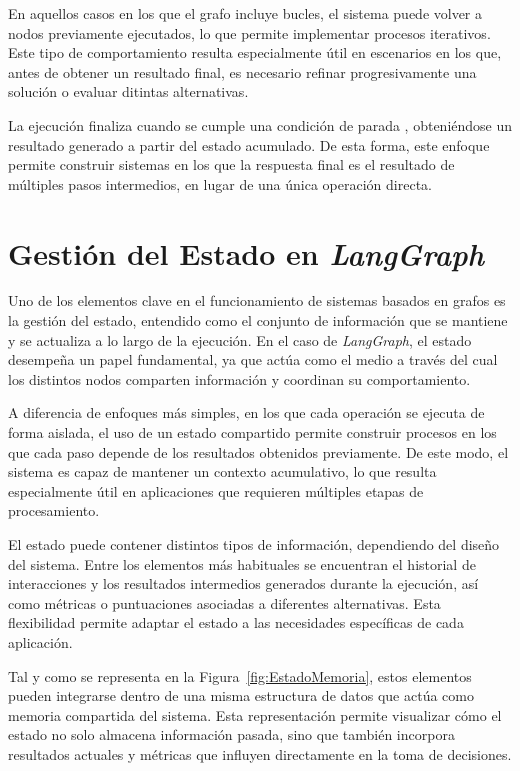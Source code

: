 \documentclass[12pt,a4paper,twoside,openright]{book}
\begin{document}
En aquellos casos en los que el grafo incluye bucles, el sistema puede volver a nodos previamente ejecutados, lo que permite implementar procesos iterativos.
Este tipo de comportamiento resulta especialmente útil en escenarios en los que, antes de obtener un resultado final, es necesario refinar progresivamente una solución o evaluar
ditintas alternativas.

La ejecución finaliza cuando se cumple una condición de parada \cite{nocedal2006numerical}, obteniéndose un resultado generado a partir del estado acumulado. De esta forma, este enfoque permite
construir sistemas en los que la respuesta final es el resultado de múltiples pasos intermedios, en lugar de una única operación directa.


\section{Gestión del Estado en \emph{LangGraph}}

Uno de los elementos clave en el funcionamiento de sistemas basados en grafos es la gestión del estado, entendido como el conjunto de información que se mantiene y se actualiza a lo
largo de la ejecución. En el caso de \emph{LangGraph}, el estado desempeña un papel fundamental, ya que actúa como el medio a través del cual los distintos nodos comparten información
y coordinan su comportamiento.

A diferencia de enfoques más simples, en los que cada operación se ejecuta de forma aislada, el uso de un estado compartido permite construir procesos en los que cada paso
depende de los resultados obtenidos previamente. De este modo, el sistema es capaz de mantener un contexto acumulativo, lo que resulta especialmente útil en aplicaciones que requieren
múltiples etapas de procesamiento.

El estado puede contener distintos tipos de información, dependiendo del diseño del sistema. Entre los elementos más habituales se encuentran el historial de interacciones y los resultados
intermedios generados durante la ejecución, así como métricas o puntuaciones asociadas a diferentes alternativas. Esta flexibilidad permite adaptar el estado a las necesidades específicas de
cada aplicación.

Tal y como se representa en la Figura~\ref{fig:EstadoMemoria}, estos elementos pueden integrarse dentro de una misma estructura de datos que actúa como memoria compartida del sistema.
Esta representación permite visualizar cómo el estado no solo almacena información pasada, sino que también incorpora resultados actuales y métricas que influyen directamente en la toma de decisiones.
\end{document}
